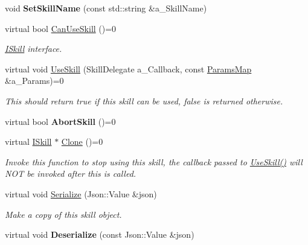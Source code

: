 \begin{DoxyCompactItemize}
\mbox{\label{class_i_skill_a45ee64d93d19b827127abc0f3acfce6c}} 
void {\bfseries Set\+Skill\+Name} (const std\+::string \&a\+\_\+\+Skill\+Name)
\item 
\mbox{\label{class_i_skill_a3a8465988d9da7e8b84e49ae318d1c55}} 
virtual bool \hyperlink{class_i_skill_a3a8465988d9da7e8b84e49ae318d1c55}{Can\+Use\+Skill} ()=0
\begin{DoxyCompactList}\small\item\em \hyperlink{class_i_skill}{I\+Skill} interface. \end{DoxyCompactList}\item 
virtual void \hyperlink{class_i_skill_a0b9243b397c4902c973f191d32a6e46d}{Use\+Skill} (Skill\+Delegate a\+\_\+\+Callback, const \hyperlink{class_params_map}{Params\+Map} \&a\+\_\+\+Params)=0
\begin{DoxyCompactList}\small\item\em This should return true if this skill can be used, false is returned otherwise. \end{DoxyCompactList}\item 
\mbox{\label{class_i_skill_ab8466db6a0ad8dba3db869871098f285}} 
virtual bool {\bfseries Abort\+Skill} ()=0
\item 
\mbox{\label{class_i_skill_a46c5a054af920bbac29db2834180588c}} 
virtual \hyperlink{class_i_skill}{I\+Skill} $\ast$ \hyperlink{class_i_skill_a46c5a054af920bbac29db2834180588c}{Clone} ()=0
\begin{DoxyCompactList}\small\item\em Invoke this function to stop using this skill, the callback passed to \hyperlink{class_i_skill_a0b9243b397c4902c973f191d32a6e46d}{Use\+Skill()} will N\+OT be invoked after this is called. \end{DoxyCompactList}\item 
virtual void \hyperlink{class_i_skill_a5a64f9e4fdb3a1b0aecd7e208cc534e2}{Serialize} (Json\+::\+Value \&json)
\begin{DoxyCompactList}\small\item\em Make a copy of this skill object. \end{DoxyCompactList}\item 
\mbox{\label{class_i_skill_a9217aea73671b2504923dbb0c1b290af}} 
virtual void {\bfseries Deserialize} (const Json\+::\+Value \&json)
\end{DoxyCompactItemize}
